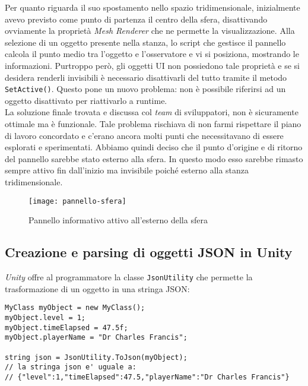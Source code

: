 Per quanto riguarda il suo spostamento nello spazio tridimensionale, inizialmente avevo previsto come punto di partenza il centro della sfera, disattivando ovviamente la proprietà \textit{Mesh Renderer} che ne permette la visualizzazione. Alla selezione di un oggetto presente nella stanza, lo script che gestisce il pannello calcola il punto medio tra l'oggetto e l'osservatore e vi si posiziona, mostrando le informazioni. Purtroppo però, gli oggetti UI non possiedono tale proprietà e se si desidera renderli invisibili è necessario disattivarli del tutto tramite il metodo \texttt{SetActive()}. Questo pone un nuovo problema: non è possibile riferirsi ad un oggetto disattivato per riattivarlo a runtime. \\
La soluzione finale trovata e discussa col \textit{team} di sviluppatori, non è sicuramente ottimale ma è funzionale. Tale problema rischiava di non farmi rispettare il piano di lavoro concordato e c'erano ancora molti punti che necessitavano di essere esplorati e sperimentati. Abbiamo quindi deciso che il punto d'origine e di ritorno del pannello sarebbe stato esterno alla sfera. In questo modo esso sarebbe rimasto sempre attivo fin dall'inizio ma invisibile poiché esterno alla stanza tridimensionale.

\label{Pannello sfera}
\begin{figure}[ht]
	\begin{center}
		\texttt{[image: pannello-sfera]}
		\caption{Pannello informativo attivo all'esterno della sfera}
	\end{center}
\end{figure}
\FloatBarrier 

\subsection{Creazione e parsing di oggetti JSON in Unity}

\textit{Unity} offre al programmatore la classe \texttt{JsonUtility} che permette la trasformazione di un oggetto in una stringa JSON:

\begin{lstlisting}[style=MyCStyle]
MyClass myObject = new MyClass();
myObject.level = 1;
myObject.timeElapsed = 47.5f;
myObject.playerName = "Dr Charles Francis";

string json = JsonUtility.ToJson(myObject);
// la stringa json e' uguale a: 
// {"level":1,"timeElapsed":47.5,"playerName":"Dr Charles Francis"}
\end{lstlisting}

